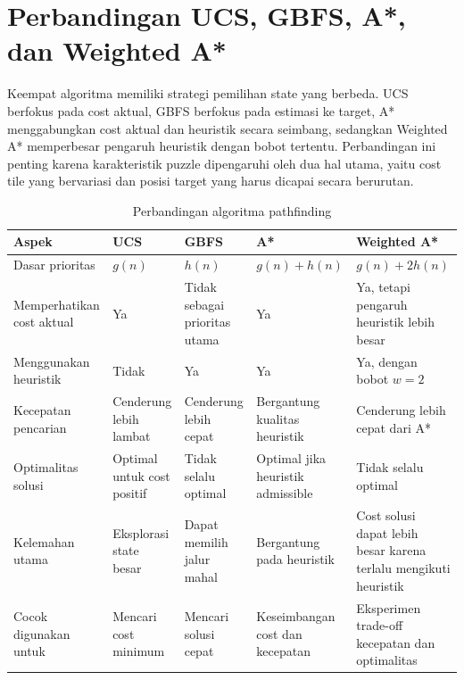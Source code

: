 \section{Perbandingan UCS, GBFS, A*, dan Weighted A*}

Keempat algoritma memiliki strategi pemilihan state yang berbeda. 
UCS berfokus pada cost aktual, GBFS berfokus pada estimasi ke target, A* menggabungkan cost aktual dan heuristik secara seimbang, sedangkan Weighted A* memperbesar pengaruh heuristik dengan bobot tertentu. 
Perbandingan ini penting karena karakteristik puzzle dipengaruhi oleh dua hal utama, yaitu cost tile yang bervariasi dan posisi target yang harus dicapai secara berurutan.

\begin{table}[H]
	\centering
	\caption{Perbandingan algoritma pathfinding}
	\small
	\begin{tabular}{|p{2.8cm}|p{2.6cm}|p{2.6cm}|p{2.8cm}|p{3cm}|}
		\hline
		\rowcolor{gray!25}
		\textbf{Aspek} & \textbf{UCS} & \textbf{GBFS} & \textbf{A*} & \textbf{Weighted A*} \\
		\hline
		Dasar prioritas & $g(n)$ & $h(n)$ & $g(n)+h(n)$ & $g(n)+2h(n)$ \\
		\hline
		Memperhatikan cost aktual & Ya & Tidak sebagai prioritas utama & Ya & Ya, tetapi pengaruh heuristik lebih besar \\
		\hline
		Menggunakan heuristik & Tidak & Ya & Ya & Ya, dengan bobot $w=2$ \\
		\hline
		Kecepatan pencarian & Cenderung lebih lambat & Cenderung lebih cepat & Bergantung kualitas heuristik & Cenderung lebih cepat dari A* \\
		\hline
		Optimalitas solusi & Optimal untuk cost positif & Tidak selalu optimal & Optimal jika heuristik admissible & Tidak selalu optimal \\
		\hline
		Kelemahan utama & Eksplorasi state besar & Dapat memilih jalur mahal & Bergantung pada heuristik & Cost solusi dapat lebih besar karena terlalu mengikuti heuristik \\
		\hline
		Cocok digunakan untuk & Mencari cost minimum & Mencari solusi cepat & Keseimbangan cost dan kecepatan & Eksperimen trade-off kecepatan dan optimalitas \\
		\hline
	\end{tabular}
\end{table}

